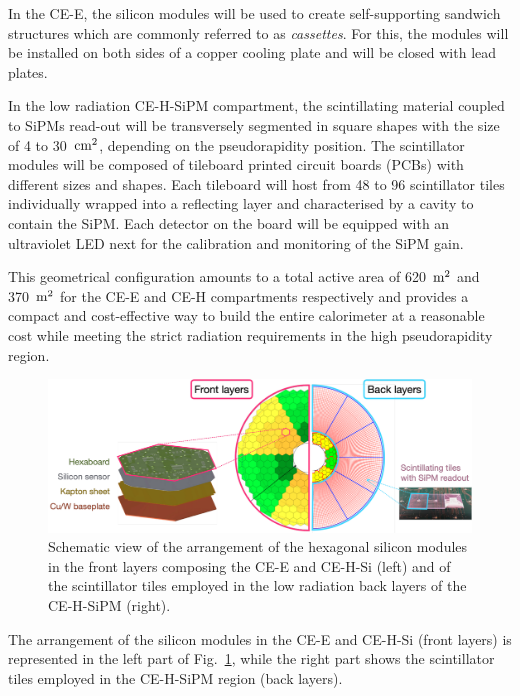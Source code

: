 In the CE-E, the silicon modules will be used to create self-supporting sandwich structures which are commonly referred to as \textit{cassettes}. For this, the modules will be installed on both sides of a copper cooling plate and will be closed with lead plates.

In the low radiation CE-H-SiPM compartment, the scintillating material coupled to SiPMs read-out will be transversely segmented in square shapes with the size of 4 to 30~$\textnormal{cm}^2$, depending on the pseudorapidity position. 
The scintillator modules will be composed of tileboard printed circuit boards (PCBs) with different sizes and shapes. Each tileboard will host from 48 to 96 scintillator tiles individually wrapped into a reflecting layer and characterised by a cavity to contain the SiPM. Each detector on the board will be equipped with an ultraviolet LED next for the calibration and monitoring of the SiPM gain. 

This geometrical configuration amounts to a total active area of 620~$\textnormal{m}^2$ and 370~$\textnormal{m}^2$ for the CE-E and CE-H compartments respectively and provides a compact and cost-effective way to build the entire calorimeter at a reasonable cost while meeting the strict radiation requirements in the high pseudorapidity region.

\begin{figure}
    \centering
    \includegraphics[width=0.9\linewidth]{Figures/HGCAL/FrontBackLayers.pdf}
    \caption{Schematic view of the arrangement of the hexagonal silicon modules in the front layers composing the CE-E and CE-H-Si (left) and of the scintillator tiles employed in the low radiation back layers of the CE-H-SiPM (right).}
    \label{fig:FrontBackLayers}
\end{figure}

The arrangement of the silicon modules in the CE-E and CE-H-Si (front layers) is represented in the left part of Fig.~\ref{fig:FrontBackLayers}, while the right part shows the scintillator tiles employed in the CE-H-SiPM region (back layers).

